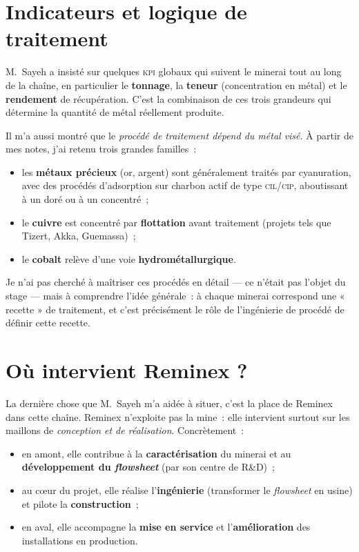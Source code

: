 \documentclass[12pt,a4paper,oneside]{report}
\newcommand{\sig}[1]{\textsc{#1}}
\begin{document}
\section{Indicateurs et logique de traitement}

M.~Sayeh a insisté sur quelques \sig{kpi} globaux qui suivent le minerai tout au long de la chaîne, en particulier le \textbf{tonnage}, la \textbf{teneur} (concentration en métal) et le \textbf{rendement} de récupération. C'est la combinaison de ces trois grandeurs qui détermine la quantité de métal réellement produite.

Il m'a aussi montré que le \emph{procédé de traitement dépend du métal visé}. À partir de mes notes, j'ai retenu trois grandes familles~:

\begin{itemize}
\item les \textbf{métaux précieux} (or, argent) sont généralement traités par cyanuration, avec des procédés d'adsorption sur charbon actif de type \sig{cil}/\sig{cip}, aboutissant à un doré ou à un concentré~;
\item le \textbf{cuivre} est concentré par \textbf{flottation} avant traitement (projets tels que Tizert, Akka, Guemassa)~;
\item le \textbf{cobalt} relève d'une voie \textbf{hydrométallurgique}.
\end{itemize}

Je n'ai pas cherché à maîtriser ces procédés en détail --- ce n'était pas l'objet du stage --- mais à comprendre l'idée générale~: à chaque minerai correspond une « recette » de traitement, et c'est précisément le rôle de l'ingénierie de procédé de définir cette recette.

\section{Où intervient Reminex ?}

La dernière chose que M.~Sayeh m'a aidée à situer, c'est la place de Reminex dans cette chaîne. Reminex n'exploite pas la mine~: elle intervient surtout sur les maillons de \emph{conception et de réalisation}. Concrètement~:

\begin{itemize}
\item en amont, elle contribue à la \textbf{caractérisation} du minerai et au \textbf{développement du \textit{flowsheet}} (par son centre de R\&D)~;
\item au cœur du projet, elle réalise l'\textbf{ingénierie} (transformer le \textit{flowsheet} en usine) et pilote la \textbf{construction}~;
\item en aval, elle accompagne la \textbf{mise en service} et l'\textbf{amélioration} des installations en production.
\end{itemize}
\end{document}
